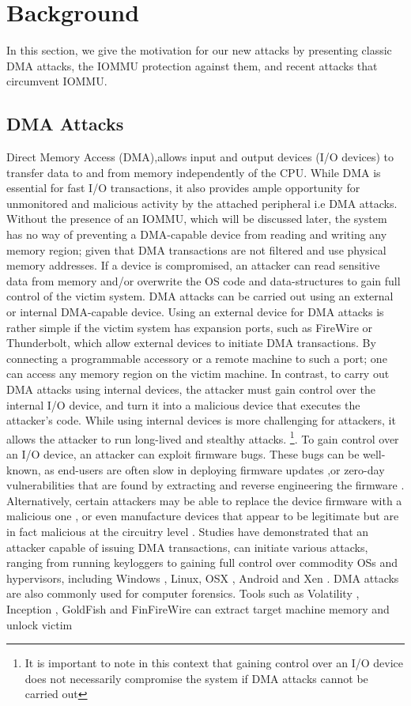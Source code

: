 \section{Background}
In this section, we give the motivation for our new attacks by presenting classic DMA attacks, the IOMMU protection against them, and recent attacks that circumvent IOMMU.
\subsection{DMA Attacks}
Direct Memory Access (DMA),allows input and output devices (I/O devices) to transfer data to and from memory \cite{oC54} independently of the CPU. While DMA is essential for fast I/O transactions, it also provides ample opportunity for unmonitored and malicious activity by the attached peripheral i.e DMA attacks. Without the presence of an IOMMU, which will be discussed later, the system has no way of preventing a DMA-capable device from reading and writing any memory region; given that DMA transactions are not filtered and use physical memory addresses. If a device is compromised, an attacker can read sensitive data from memory and/or overwrite the OS code and data-structures to gain full control of the victim system. DMA attacks can be carried out using an external or internal DMA-capable device. Using an external device for DMA attacks is rather simple if the victim system has expansion ports, such as FireWire or Thunderbolt, which allow external devices to initiate DMA transactions. By connecting a programmable accessory or a remote machine to such a port; one can access  any memory region on the victim machine\cite{Dor04, Vol, MM, thunder}. In contrast, to carry out DMA attacks using internal devices, the attacker must gain control over the internal I/O device, and turn it into a malicious device that executes the attacker’s code. While using internal devices is more challenging for attackers, it allows the attacker to run long-lived and stealthy attacks. \footnote{It is important to note in this context that gaining control over an I/O device does not necessarily compromise the system if DMA attacks cannot be carried out}. To gain control over an I/O device, an attacker can exploit firmware bugs. These bugs can be well-known, as end-users are often slow in deploying firmware updates \cite{DPVL10},or zero-day vulnerabilities that are found by extracting and reverse engineering the firmware \cite{Ben17b}. Alternatively, certain attackers may be able to replace the device firmware with a malicious one \cite{ZKB13, NL14}, or even manufacture devices that appear to be legitimate but are in fact malicious at the circuitry level \cite{YHD16, thunder}. Studies have demonstrated that an attacker capable of issuing DMA transactions, can initiate various attacks, ranging from running keyloggers \cite{LKV13, SB12} to gaining full control over commodity OSs and hypervisors, including Windows \cite{AD10,thunder}, Linux, OSX \cite{Fri16, thunder}, Android \cite{Ben17b} and Xen \cite{Woj08}. DMA attacks are also commonly used for computer forensics. Tools such as Volatility \cite{Vol}, Inception \cite{MM}, GoldFish \cite{GA10} and FinFireWire \cite{Fin14} can extract target machine memory and unlock victim 
